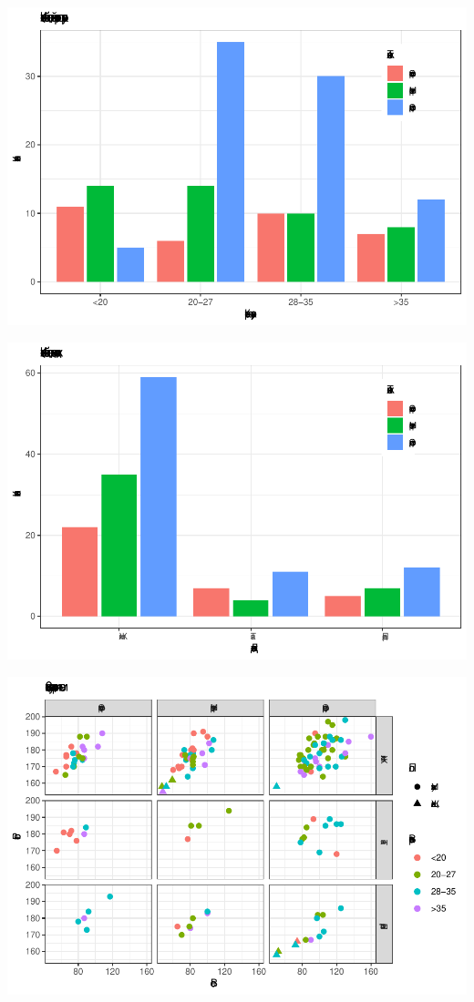 \documentclass[
]{article}
\begin{document}
\begin{center}\includegraphics[width=0.85\linewidth]{Regression-model-for-estimating-RM_files/figure-latex/unnamed-chunk-26-5} \end{center}

\begin{center}\includegraphics[width=0.85\linewidth]{Regression-model-for-estimating-RM_files/figure-latex/unnamed-chunk-26-6} \end{center}

\begin{center}\includegraphics[width=0.85\linewidth]{Regression-model-for-estimating-RM_files/figure-latex/unnamed-chunk-26-7} \end{center}
\end{document}
